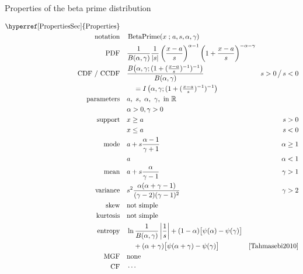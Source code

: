 

\begin{table*}[tp]
\caption[Beta prime distribution -- Properties] {Properties of the beta prime distribution}
\begin{align*}
 \text{\hyperref[PropertiesSec]{Properties}}  \quad& \\
\text{notation} \quad & \op{BetaPrime}(x\given a, s, \alpha,\gamma)  	\checked
\\
\text{PDF}\quad &    \frac{1}{B(\alpha, \gamma)} \frac{1}{|s|}
\left(\frac{x-a}{s}\right)^{\alpha -1} \left(1+ \frac{x-a}{s} \right)^{-\alpha-\gamma } \checked
\hspace{-2em}
\\
\text{CDF / CCDF} \quad  &  
\frac{B\big(\alpha, \gamma; (1+(\tfrac{x-a}{s})^{-1})^{-1} \big) }{B(\alpha,\gamma)} \checked
\hspace{-8em}
& s >0 \,\big/ \, s<0
\\ 
& \quad = I\left(  \alpha,\gamma; (1+(\tfrac{x-a}{s})^{-1})^{-1} \right) 			\checked
\\
\text{parameters}\quad &   a,\ s,\ \alpha,\ \gamma, \text{ in } \Real \checked 
\\ & \alpha>0, \gamma>0 \checked
\\
\text{support} \quad &    x \geq a &  s > 0 			\checked
\\
&  x\leq a  &  s < 0 							\checked
\\
\text{mode} \quad  & a + s \frac{\alpha-1}{\gamma+1} & \alpha\geq 1 \checked \\
& a &\alpha<1 \checked
\\
\text{mean} \quad  &   a+s \frac{ \alpha}{\gamma-1} \checked
& \gamma >1
\\
\text{variance} \quad  &s^2
\frac{\alpha(\alpha+\gamma-1)}{(\gamma-2)(\gamma-1)^2} \checked
  \hspace{-8em}
&   \gamma>2
\\
\text{skew} \quad  &  \text{not simple}
\\
\text{kurtosis} \quad  &  \text{not simple}
\\
\text{entropy} \quad  &   \ln \frac{1}{B(\alpha, \gamma)} \left|\frac{1}{s}\right|
  +(1-\alpha) \big[ \psi(\alpha) - \psi(\gamma)\big]
  \hspace{-8em}
\\
& \quad +(\alpha+\gamma) \big[ \psi(\alpha+\gamma) - \psi(\gamma)\big] \checked &  \text{\cite[Eq.~(15)]{Tahmasebi2010}}
\\
\text{MGF} \quad  &  \text{none}
\\
\text{CF} \quad  &  \cdots 
\end{align*}
\end{table*}


